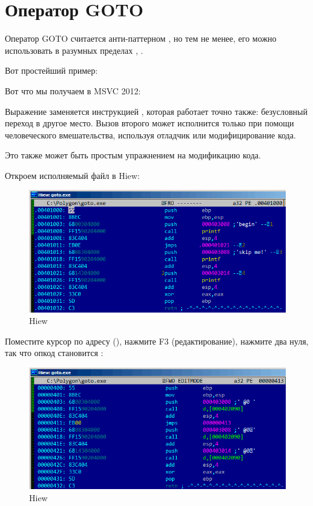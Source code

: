 \chapter{Оператор GOTO}

Оператор GOTO считается анти-паттерном 
\cite{Dijkstra:1968:LEG:362929.362947}, 
но тем не менее, его можно использовать в разумных пределах
 \cite{Knuth:1974:SPG:356635.356640}, \cite[1.3.2]{CBook}.

Вот простейший пример:



Вот что мы получаем в MSVC 2012:



Выражение  заменяется инструкцией \JMP, которая работает точно также: безусловный переход в другое место.
Вызов второго \printf может исполнится только при помощи человеческого вмешательства, используя отладчик или модифицирование кода.

\par

\ifdefined\IncludeHiew
\clearpage
Это также может быть простым упражнением на модификацию кода.

Откроем исполняемый файл в Hiew:

\begin{figure}[H]
\centering
\includegraphics[scale=\FigScale]{patterns/065_GOTO/hiew1.png}
\caption{Hiew}
\label{fig:goto_hiew1}
\end{figure}

\clearpage
Поместите курсор по адресу \JMP (), 
нажмите F3 (редактирование), нажмите два нуля, так что
опкод становится :

\begin{figure}[H]
\centering
\includegraphics[scale=\FigScale]{patterns/065_GOTO/hiew2.png}
\caption{Hiew}
\label{fig:goto_hiew2}
\end{figure}

